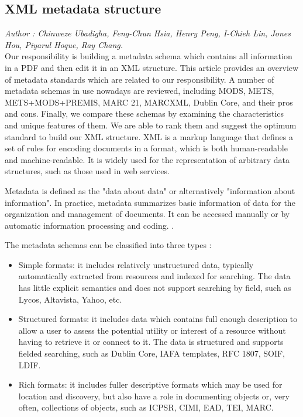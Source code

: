 \subsection{XML metadata structure}
\textit{\footnotesize Author : Chinweze Ubadigha, Feng-Chun Hsia, Henry Peng, I-Chieh Lin, Jones Hou, Piyarul Hoque, Ray Chang.}\\

Our responsibility is building a metadata schema which contains all information in a PDF and then edit it in an XML structure. 
This article provides an overview of metadata standards which are related to our responsibility. 
A number of metadata schemas in use nowadays are reviewed, including MODS, METS, METS+MODS+PREMIS, MARC 21, MARCXML, Dublin Core, and  their pros and cons. 
Finally, we compare these schemas by examining the characteristics and unique features of them. 
We are able to rank them and suggest the optimum standard to build our XML structure. 
XML is a markup language that defines a set of rules for encoding documents in a format,  which is both human-readable and machine-readable. 
It is widely used for the representation of arbitrary data structures, such as those used in web services.

Metadata is defined as the "data about data" or alternatively "information about information". 
In practice, metadata summarizes basic information of data for the organization and management of documents. 
It can be accessed manually or by automatic information processing and coding. \cite{underwood2003xml}.

The metadata schemas can be classified into three types \cite{dempsey1997specification}:
\begin{itemize}
	\item Simple formats: it includes relatively unstructured data, typically automatically extracted from resources and indexed for searching. 
	The data has little explicit semantics and does not support searching by field, such as Lycos, Altavista, Yahoo, etc.
	\item Structured formats: it includes data which contains full enough description to allow a user to assess the potential utility or interest of a resource without having to retrieve it or connect to it. 
	The data is structured and supports fielded searching, such as Dublin Core, IAFA templates, RFC 1807, SOIF, LDIF.
	\item Rich formats: it includes fuller descriptive formats which may be used for location and discovery, 
	but also have a role in documenting objects or, very often, collections of objects, such as ICPSR, CIMI, EAD, TEI, MARC.
\end{itemize}


